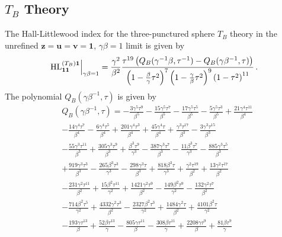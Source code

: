 \documentclass[main.tex]{subfiles}
\begin{document}
\subsection{\texorpdfstring{$T_B$}{TB} Theory}
The Hall-Littlewood index for the three-punctured sphere $T_B$ theory in the unrefined $\mathbf{z}=\mathbf{u}=\mathbf{v}=\mathbf{1}$, $\gamma\beta=1$ limit is given by
\begin{equation}
\left.\textrm{HL}^{(T_B)\mathbf{1}}_{\mathbf{1}\mathbf{1}}\right|_{\gamma\beta=1}=\frac{\gamma^2}{\beta^2}\frac{\tau^{19}\left(Q_B(\gamma^{-1}\beta,\tau^{-1})-Q_B(\gamma\beta^{-1},\tau)\right)}{\left(1-\frac{\beta}{\gamma}\tau^2\right)^{7}\left(1-\frac{\gamma}{\beta}\tau^2\right)^{9}\left(1-\tau^2\right)^{11}}\,.
\end{equation}
The polynomial $Q_B(\gamma\beta^{-1},\tau)$ is given by
\begin{equation}
\begin{aligned}
&Q_B(\gamma\beta^{-1},\tau)=-\frac{3 \gamma ^5 \tau ^9}{\beta ^5}-\frac{15 \gamma ^5 \tau ^7}{\beta ^5}-\frac{17 \gamma ^5 \tau ^5}{\beta ^5}-\frac{5 \gamma ^5 \tau ^3}{\beta ^5}+\frac{21 \gamma ^4 \tau ^{11}}{\beta ^4}\\
&-\frac{14 \gamma ^4 \tau ^7}{\beta ^4}-\frac{6 \gamma ^4 \tau ^5}{\beta ^4}+\frac{201 \gamma ^4 \tau ^3}{\beta ^4}+\frac{45 \gamma ^4 \tau }{\beta ^4}+\frac{\gamma ^3 \tau ^{17}}{\beta
   ^3}-\frac{3 \gamma ^3 \tau ^{15}}{\beta ^3}\\
   &-\frac{55 \gamma ^3 \tau ^{11}}{\beta ^3}+\frac{305 \gamma ^3 \tau ^9}{\beta ^3}+\frac{\beta ^3 \tau ^9}{\gamma
   ^3}-\frac{387 \gamma ^3 \tau ^7}{\beta ^3}-\frac{11 \beta ^3 \tau ^7}{\gamma ^3}-\frac{885 \gamma ^3 \tau ^5}{\beta ^3}\\
   &+\frac{919 \gamma ^3 \tau ^3}{\beta ^3}-\frac{265\beta ^3 \tau ^3}{\gamma ^3}-\frac{298 \gamma ^3 \tau }{\beta ^3}+\frac{818 \beta ^3 \tau }{\gamma ^3}+\frac{\gamma ^2 \tau ^{19}}{\beta ^2}+\frac{13 \gamma ^2 \tau ^{17}}{\beta ^2}\\
   &-\frac{231 \gamma ^2 \tau ^{11}}{\beta ^2}+\frac{15 \beta ^2 \tau ^{11}}{\gamma ^2}+\frac{1421 \gamma ^2 \tau ^9}{\beta ^2}-\frac{149 \beta ^2 \tau
   ^9}{\gamma ^2}-\frac{132 \gamma ^2 \tau ^7}{\beta ^2}\\
 &-\frac{714 \beta ^2 \tau ^5}{\gamma ^2}+\frac{4332 \gamma ^2 \tau ^3}{\beta
   ^2}-\frac{2327 \beta ^2 \tau ^3}{\gamma ^2}+\frac{1484 \gamma ^2 \tau }{\beta ^2}+\frac{4101 \beta ^2 \tau }{\gamma ^2}\\
   &-\frac{193
   \gamma  \tau ^{13}}{\beta }+\frac{52 \beta  \tau ^{13}}{\gamma }-\frac{805 \gamma  \tau ^{11}}{\beta }-\frac{308 \beta  \tau ^{11}}{\gamma }+\frac{2208 \gamma  \tau ^9}{\beta }+\frac{81 \beta  \tau ^9}{\gamma
}
\end{aligned}
\end{equation}
\end{document}
